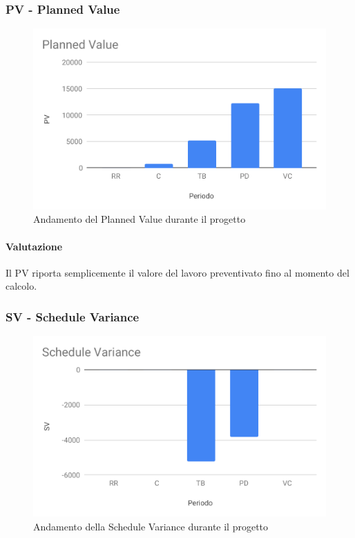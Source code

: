 \subsubsection{PV - Planned Value}
\begin{figure}[H]
	\centering
	\includegraphics[scale=0.7]{res/images/RA/pv.pdf}
	\caption{Andamento del Planned Value durante il progetto}
\end{figure}
\paragraph*{Valutazione}
Il PV riporta semplicemente il valore del lavoro preventivato fino al momento del calcolo.

\subsubsection{SV - Schedule Variance}
\begin{figure}[H]
	\centering
	\includegraphics[scale=0.7]{res/images/RA/sv.pdf}
	\caption{Andamento della Schedule Variance durante il progetto}
\end{figure}
